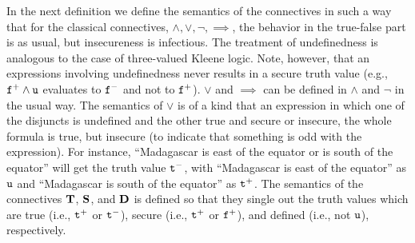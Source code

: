 \documentclass{\filespath jancl}
\newcommand{\undefined}{{\sf u}}
\newcommand{\twts}{{{\sf t}^+}}
\newcommand{\twfs}{{{\sf f}^+}}
\newcommand{\twti}{{{\sf t}^-}}
\newcommand{\twfi}{{{\sf f}^-}}
\newcommand{\twu}{{\sf u}}
\def\tf{{\bf D}}
\def\holds{{\bf T}}
\def\deft{{\bf S}}
\def\sf{\tt}
\def\impl{\implies}\def\non{\neg}
\begin{document}
In the next definition we define the semantics of the connectives in
such a way that for the classical connectives, $\land, \lor, \non,
\impl$, the behavior in the true-false part is as usual, but
insecureness is infectious. The treatment of undefinedness is
analogous to the case of three-valued Kleene logic. Note, however,
that an expressions involving undefinedness never results in a secure
truth value (e.g., $\twfs\land\twu$ evaluates to $\twfi$ and not to
$\twfs$). $\lor$ and $\impl$ can be defined in $\land$ and $\non$ in
the usual way. The semantics of $\lor$ is of a kind that an expression
in which one of the disjuncts is undefined and the other true and
secure or insecure, the whole formula is true, but insecure (to
indicate that something is odd with the expression). For instance,
``Madagascar is east of the equator or is south of the equator'' will
get the truth value $\twti$, with ``Madagascar is east of the
equator'' as $\twu$ and ``Madagascar is south of the equator'' as
$\twts$. The semantics of the connectives $\holds$, $\deft$, and $\tf$
is defined so that they single out the truth values which are true
(i.e., $\twts$ or $\twti$), secure (i.e., $\twts$ or $\twfs$), and
defined (i.e., not $\undefined$), respectively.
\end{document}
